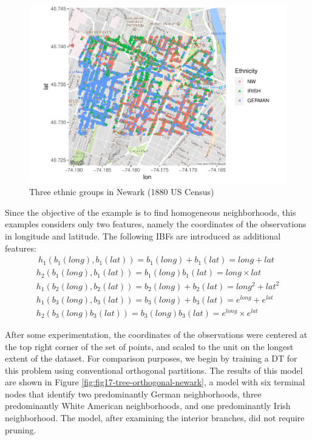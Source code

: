 \documentclass[]{elsarticle} %
\makeatletter
\def\maxwidth{\ifdim\Gin@nat@width>\linewidth\linewidth
\else\Gin@nat@width\fi}
\let\Oldincludegraphics\includegraphics
\renewcommand{\includegraphics}[1]{\Oldincludegraphics[width=\maxwidth]{#1}}
\makeatother
\begin{document}
\begin{figure}[htbp]
\centering
\includegraphics{Trees_with_Base_Functions_v2_files/figure-latex/fig16-map-newark-1.pdf}
\caption{\label{fig:fig16-map-newark}Three ethnic groups in Newark (1880
US Census)}
\end{figure}

Since the objective of the example is to find homogeneous neighborhoods,
this examples considers only two features, namely the coordinates of the
observations in longitude and latitude. The following IBFs are
introduced as additional features: \[
\begin{array}{c}\
h_1(b_1(long),b_1(lat))=b_1(long)+b_1(lat)=long+lat\\
h_2(b_1(long),b_1(lat))=b_1(long)b_1(lat)=long\times lat\\
h_1(b_2(long),b_2(lat))=b_2(long)+b_2(lat)=long^2+lat^2\\
h_1(b_3(long),b_3(lat))=b_3(long)+b_3(lat)=e^{long}+e^{lat}\\
h_2(b_3(long)b_3(lat))=b_3(long)b_3(lat)=e^{long}\times e^{lat}
\end{array}
\]

After some experimentation, the coordinates of the observations were
centered at the top right corner of the set of points, and scaled to the
unit on the longest extent of the dataset. For comparison purposes, we
begin by training a DT for this problem using conventional orthogonal
partitions. The results of this model are shown in Figure
\ref{fig:fig17-tree-orthogonal-newark}, a model with six terminal nodes
that identify two predominantly German neighborhoods, three
predominantly White American neighborhoods, and one predominantly Irish
neighborhood. The model, after examining the interior branches, did not
require pruning.
\end{document}
